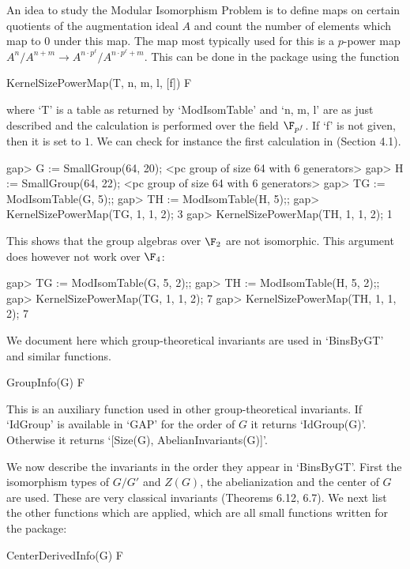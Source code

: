\endexample


An idea to study the Modular Isomorphism Problem is to define maps on certain
quotients of the augmentation ideal $A$ and count the number of elements which map
to $0$ under this map. The map most typically used for this is a $p$-power map
$A^n/A^{n+m} \rightarrow A^{n \cdot p^\ell}/A^{n \cdot p^\ell + m}$. This can 
be done in the package using the function

\> KernelSizePowerMap(T, n, m, l, [f]) F

where `T' is a table as returned by `ModIsomTable' and `n, m, l' are as 
just described and the calculation is performed over the field $\F_{p^f}$.
If `f' is not given, then it is set to $1$.
We can check for instance the first calculation in \cite{HS06}(Section 4.1).

\beginexample
gap> G := SmallGroup(64, 20);
<pc group of size 64 with 6 generators>
gap> H := SmallGroup(64, 22);
<pc group of size 64 with 6 generators>
gap> TG := ModIsomTable(G, 5);;
gap> TH := ModIsomTable(H, 5);;
gap> KernelSizePowerMap(TG, 1, 1, 2);
3
gap> KernelSizePowerMap(TH, 1, 1, 2);
1
\endexample

This shows that the group algebras over $\F_2$ are not isomorphic. This 
argument does however not work over $\F_4$:

\beginexample
gap> TG := ModIsomTable(G, 5, 2);;
gap> TH := ModIsomTable(H, 5, 2);;
gap> KernelSizePowerMap(TG, 1, 1, 2);
7
gap> KernelSizePowerMap(TH, 1, 1, 2);
7
\endexample


We document here which group-theoretical invariants are used in `BinsByGT' and 
similar functions.

\> GroupInfo(G) F

This is an auxiliary function used in other group-theoretical invariants. 
If `IdGroup' is available in `GAP' for the order of $G$ it returns `IdGroup(G)'.
Otherwise it returns `[Size(G), AbelianInvariants(G)]'. 

We now describe the invariants in the order they appear in `BinsByGT'. 
First the isomorphism types of $G/G'$ and $Z(G)$, the abelianization and the center
of $G$ are used. These are very classical invariants \cite{San85}(Theorems 6.12, 6.7).
We next list the other functions which are applied, which are all small functions written 
for the package:

\> CenterDerivedInfo(G) F

